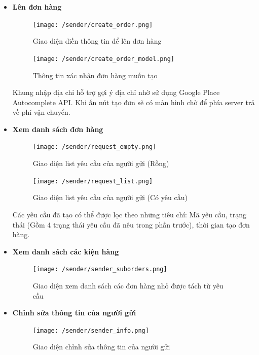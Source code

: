	\begin{itemize}
		\item \textbf{Lên đơn hàng}
		\begin{figure}[H]
			\texttt{[image: /sender/create\_order.png]}
			\centering
			\caption{Giao diện điền thông tin để lên đơn hàng}
		\end{figure}
	
		\begin{figure}[H]
			\texttt{[image: /sender/create\_order\_model.png]}
			\centering
			\caption{Thông tin xác nhận đơn hàng muốn tạo}
		\end{figure}
		Khung nhập địa chỉ hỗ trợ gợi ý địa chỉ nhờ sử dụng Google Place Autocomplete API. Khi ấn nút tạo đơn sẽ có màn hình chờ để phía server trả về phí vận chuyển.
		
		\item \textbf{Xem danh sách đơn hàng}
		\begin{figure}[H]
			\texttt{[image: /sender/request\_empty.png]}
			\centering
			\caption{Giao diện list yêu cầu của người gửi (Rỗng)}
		\end{figure}
		
		\begin{figure}[H]
			\texttt{[image: /sender/request\_list.png]}
			\centering
			\caption{Giao diện list yêu cầu của người gửi (Có yêu cầu)}
		\end{figure}
		Các yêu cầu đã tạo có thể được lọc theo những tiêu chí: Mã yêu cầu, trạng thái (Gồm 4 trạng thái yêu cầu đã nêu trong phần trước), thời gian tạo đơn hàng.
		
		\item \textbf{Xem danh sách các kiện hàng}
		\begin{figure}[H]
			\texttt{[image: /sender/sender\_suborders.png]}
			\centering
			\caption{Giao diện xem danh sách các đơn hàng nhỏ được tách từ yêu cầu}
		\end{figure}
	
		\item \textbf{Chỉnh sửa thông tin của người gửi}
		
		\begin{figure}[H]
			\texttt{[image: /sender/sender\_info.png]}
			\centering
			\caption{Giao diện chỉnh sửa thông tin của người gửi}
		\end{figure}
		
		
	\end{itemize}


